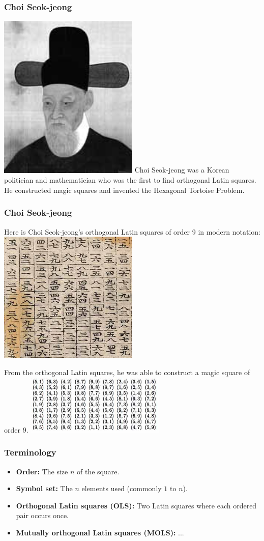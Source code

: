 \documentclass{beamer}
\begin{document}
\begin{frame}
\frametitle{Choi Seok-jeong}
\includegraphics[width=0.5\textwidth]{img12}
Choi Seok-jeong was a Korean politician and mathematician who was the first to find orthogonal Latin squares. He constructed magic squares and invented the Hexagonal Tortoise Problem.
\end{frame}

\begin{frame}
\frametitle{Choi Seok-jeong}
Here is Choi Seok-jeong's orthogonal Latin squares of order 9 in modern notation:
\includegraphics[width=0.5\textwidth]{img10}

From the orthogonal Latin squares, he was able to construct a magic square of order 9.
\includegraphics[width=0.5\textwidth]{img11}
\end{frame}

\begin{frame}
\frametitle{Terminology}
\begin{itemize}
  \item \textbf{Order:} The size $n$ of the square.
  \item \textbf{Symbol set:} The $n$ elements used (commonly $1$ to $n$).
  \item \textbf{Orthogonal Latin squares (OLS):} Two Latin squares where each ordered pair occurs once.
  \item \textbf{Mutually orthogonal Latin squares (MOLS):} ...
\end{itemize}
\end{frame}
\end{document}
